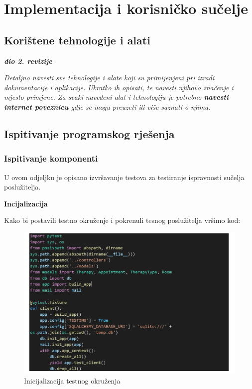 \chapter{Implementacija i korisničko sučelje}
		
		
		\section{Korištene tehnologije i alati}
		
			\textbf{\textit{dio 2. revizije}}
			
			 \textit{Detaljno navesti sve tehnologije i alate koji su primijenjeni pri izradi dokumentacije i aplikacije. Ukratko ih opisati, te navesti njihovo značenje i mjesto primjene. Za svaki navedeni alat i tehnologiju je potrebno \textbf{navesti internet poveznicu} gdje se mogu preuzeti ili više saznati o njima}.
			
			
			\eject 
		
	
		\section{Ispitivanje programskog rješenja}
			
			\subsection{Ispitivanje komponenti}
			
			U ovom odjeljku je opisano izvršavanje testova za testiranje ispravnosti sučelja poslužitelja. 
			
			
			\textbf{Incijalizacija}
			
			
			Kako bi postavili testno okruženje i pokrenuli tesnog poslužitelja vršimo kod:
			
			\begin{figure}[H]
				\includegraphics[scale=0.3]{slike/testno_okruzenje.PNG} %
				\centering
				\caption{Inicijalizacija testnog okruženja}
				\label{fig:testno_okruzenje}
			\end{figure}
			
